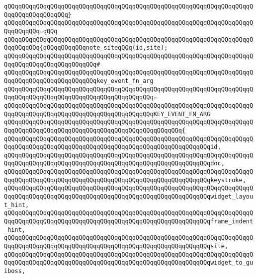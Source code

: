 \verb|qQQqqQQqqQQqqQQqqQQqqQQqqQQqqQQqqQQqqQQqqQQqqQQqqQQqqQQqqQQqqQQqqQQqqQQqqQQqqQQqqQQqqQQq}|\newline
\verb|qQQqqQQqqQQqqQQqqQQqqQQqqQQqqQQqqQQqqQQqqQQqqQQqqQQqqQQqqQQqqQQqqQQqqQQqqQQqqQQq=qQQq|\newline
\verb|qQQqqQQqqQQqqQQqqQQqqQQqqQQqqQQqqQQqqQQqqQQqqQQqqQQqqQQqqQQqqQQqqQQqqQQqqQQqqQQq{qQQqqQQqqQQqnote_siteqQQq(id,site);|\newline
\verb|qQQqqQQqqQQqqQQqqQQqqQQqqQQqqQQqqQQqqQQqqQQqqQQqqQQqqQQqqQQqqQQqqQQqqQQqqQQqqQQqqQQqqQQqqQQqqQQq#|\newline
\verb|qQQqqQQqqQQqqQQqqQQqqQQqqQQqqQQqqQQqqQQqqQQqqQQqqQQqqQQqqQQqqQQqqQQqqQQqqQQqqQQqqQQqqQQqqQQqqQQqkey_event_fn_arg|\newline
\verb|qQQqqQQqqQQqqQQqqQQqqQQqqQQqqQQqqQQqqQQqqQQqqQQqqQQqqQQqqQQqqQQqqQQqqQQqqQQqqQQqqQQqqQQqqQQqqQQqqQQqqQQqqQQqqQQq=|\newline
\verb|qQQqqQQqqQQqqQQqqQQqqQQqqQQqqQQqqQQqqQQqqQQqqQQqqQQqqQQqqQQqqQQqqQQqqQQqqQQqqQQqqQQqqQQqqQQqqQQqqQQqqQQqqQQqqQQqKEY_EVENT_FN_ARG|\newline
\verb|qQQqqQQqqQQqqQQqqQQqqQQqqQQqqQQqqQQqqQQqqQQqqQQqqQQqqQQqqQQqqQQqqQQqqQQqqQQqqQQqqQQqqQQqqQQqqQQqqQQqqQQqqQQqqQQqqQQqqQQq{|\newline
\verb|qQQqqQQqqQQqqQQqqQQqqQQqqQQqqQQqqQQqqQQqqQQqqQQqqQQqqQQqqQQqqQQqqQQqqQQqqQQqqQQqqQQqqQQqqQQqqQQqqQQqqQQqqQQqqQQqqQQqqQQqqQQqqQQqid,|\newline
\verb|qQQqqQQqqQQqqQQqqQQqqQQqqQQqqQQqqQQqqQQqqQQqqQQqqQQqqQQqqQQqqQQqqQQqqQQqqQQqqQQqqQQqqQQqqQQqqQQqqQQqqQQqqQQqqQQqqQQqqQQqqQQqqQQqdoc,|\newline
\verb|qQQqqQQqqQQqqQQqqQQqqQQqqQQqqQQqqQQqqQQqqQQqqQQqqQQqqQQqqQQqqQQqqQQqqQQqqQQqqQQqqQQqqQQqqQQqqQQqqQQqqQQqqQQqqQQqqQQqqQQqqQQqqQQqkeystroke,|\newline
\verb|qQQqqQQqqQQqqQQqqQQqqQQqqQQqqQQqqQQqqQQqqQQqqQQqqQQqqQQqqQQqqQQqqQQqqQQqqQQqqQQqqQQqqQQqqQQqqQQqqQQqqQQqqQQqqQQqqQQqqQQqqQQqqQQqwidget_layout_hint,|\newline
\verb|qQQqqQQqqQQqqQQqqQQqqQQqqQQqqQQqqQQqqQQqqQQqqQQqqQQqqQQqqQQqqQQqqQQqqQQqqQQqqQQqqQQqqQQqqQQqqQQqqQQqqQQqqQQqqQQqqQQqqQQqqQQqqQQqframe_indent_hint,|\newline
\verb|qQQqqQQqqQQqqQQqqQQqqQQqqQQqqQQqqQQqqQQqqQQqqQQqqQQqqQQqqQQqqQQqqQQqqQQqqQQqqQQqqQQqqQQqqQQqqQQqqQQqqQQqqQQqqQQqqQQqqQQqqQQqqQQqsite,|\newline
\verb|qQQqqQQqqQQqqQQqqQQqqQQqqQQqqQQqqQQqqQQqqQQqqQQqqQQqqQQqqQQqqQQqqQQqqQQqqQQqqQQqqQQqqQQqqQQqqQQqqQQqqQQqqQQqqQQqqQQqqQQqqQQqqQQqwidget_to_guiboss,|\newline
